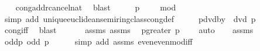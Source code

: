 \begin{isabellebody}
\ \ \isamarkupfalse%
\ cong{\isacharunderscore}{\kern0pt}add{\isacharunderscore}{\kern0pt}rcancel{\isacharunderscore}{\kern0pt}nat\ \isamarkupfalse%
\ blast\isanewline
\ \ \isamarkupfalse%
\ \isamarkupfalse%
\ {\isachardoublequoteopen}{\isacharbrackleft}{\kern0pt}p\ {\isacharplus}{\kern0pt}\ {}\ {\isacharequal}{\kern0pt}\ {}{\isacharbrackright}{\kern0pt}\ {\isacharparenleft}{\kern0pt}mod\ {}{\isacharparenright}{\kern0pt}{\isachardoublequoteclose}\ \isanewline
\ \ \ \ \isamarkupfalse%
\ {\isacharparenleft}{\kern0pt}simp\ add{\isacharcolon}{\kern0pt}\ unique{\isacharunderscore}{\kern0pt}euclidean{\isacharunderscore}{\kern0pt}semiring{\isacharunderscore}{\kern0pt}class{\isachardot}{\kern0pt}cong{\isacharunderscore}{\kern0pt}def{\isacharparenright}{\kern0pt}\isanewline
\ \ \isamarkupfalse%
\ \isamarkupfalse%
\ p{\isacharunderscore}{\kern0pt}dvd{\isacharunderscore}{\kern0pt}by{\isacharunderscore}{\kern0pt}{}{\isacharcolon}{\kern0pt}\ {\isachardoublequoteopen}{}\ dvd\ p\ {\isacharplus}{\kern0pt}\ {}{\isachardoublequoteclose}\ \isanewline
\ \ \ \ \isamarkupfalse%
\ cong{\isacharunderscore}{\kern0pt}{}{\isacharunderscore}{\kern0pt}iff\ \isamarkupfalse%
\ blast\isanewline
\ \ \isanewline
\ \ \isamarkupfalse%
\ assms{\isacharparenleft}{\kern0pt}{}{\isacharparenright}{\kern0pt}\ assms{\isacharparenleft}{\kern0pt}{}{\isacharparenright}{\kern0pt}\ \isamarkupfalse%
\ p{\isacharunderscore}{\kern0pt}greater{\isacharunderscore}{\kern0pt}{}{\isacharcolon}{\kern0pt}\ {\isachardoublequoteopen}p\ {\isasymge}\ {}{\isachardoublequoteclose}\ \isamarkupfalse%
\ auto\isanewline
\ \ \isamarkupfalse%
\ assms{\isacharparenleft}{\kern0pt}{}{\isacharparenright}{\kern0pt}\ \isamarkupfalse%
\ odd{\isacharunderscore}{\kern0pt}p{\isacharcolon}{\kern0pt}\ {\isachardoublequoteopen}odd\ p{\isachardoublequoteclose}\isanewline
\ \ \ \ \isamarkupfalse%
\ {\isacharparenleft}{\kern0pt}simp\ add{\isacharcolon}{\kern0pt}\ assms{\isacharparenleft}{\kern0pt}{}{\isacharparenright}{\kern0pt}\ even{\isacharunderscore}{\kern0pt}even{\isacharunderscore}{\kern0pt}mod{\isacharunderscore}{\kern0pt}{}{\isacharunderscore}{\kern0pt}iff{\isacharparenright}{\kern0pt}\isanewline
\ \ \isamarkupfalse%

\end{isabellebody}
